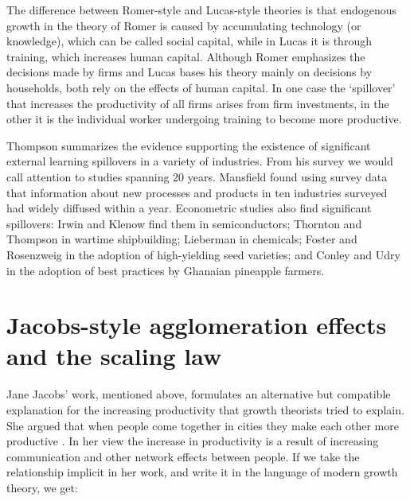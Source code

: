 The difference between Romer-style and Lucas-style theories is that endogenous growth in the theory of Romer is caused by accumulating technology (or knowledge), which can be called social capital, while in Lucas it is through training, which increases human capital. %
Although Romer emphasizes the decisions made by firms and Lucas bases his theory mainly on decisions by households, both rely on the effects of human capital. In one case the `spillover' that increases the productivity of all firms arises from firm investments, in the other it is the individual worker undergoing training to become more productive. 

Thompson  \cite{thompsonLearningDoing2010} summarizes the evidence supporting the existence of significant external learning spillovers in a variety of industries. From his survey we would call attention to studies spanning 20 years.
Mansfield \cite{mansfieldHowRapidlyDoes1985} found using survey data that information about new processes and products in ten industries surveyed had widely diffused within a year. Econometric studies also find significant spillovers: 
Irwin and Klenow \cite{irwinLearningbyDoingSpilloversSemiconductor1994}  find them in semiconductors; 
Thornton and Thompson \cite{rebeccaacheethorntonLearningExperienceLearning2001} in wartime shipbuilding; 
Lieberman \cite{marvinb.liebermanLearningCurveTechnology1989}  in chemicals; 
Foster and Rosenzweig \cite{fosterLearningDoingLearning1995}  in the adoption of high-yielding seed varieties; and 
Conley and Udry \cite{timothyg.conleyLearningNewTechnology2005}
in the adoption of best practices by Ghanaian pineapple farmers.


\section{Jacobs-style agglomeration effects and the scaling law}\label{section-growth-Jacobs}

Jane Jacobs' work, mentioned above, formulates %
an alternative but compatible explanation for the increasing productivity that growth theorists tried to explain. She argued that when people come together in cities they make each other more productive \cite{jacobsEconomyCities1969}. In her view the increase in productivity is a result of increasing communication and other network effects between people. %
If we take the relationship implicit in her work, and write it in the language of modern growth theory, we get:

